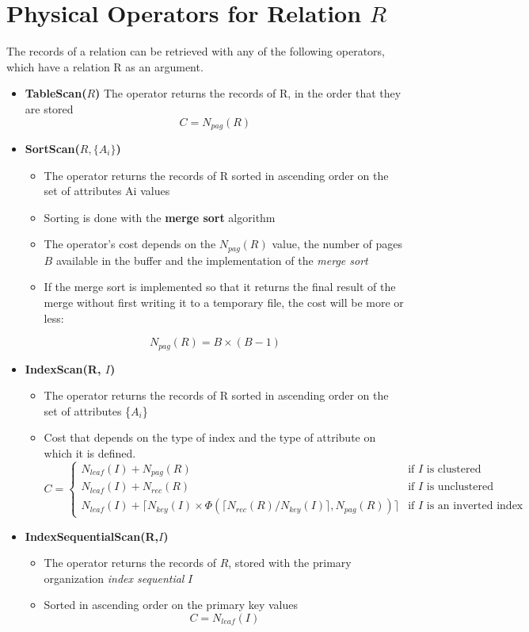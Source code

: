 \section{Physical Operators for Relation $R$}
The records of a relation can be retrieved with any of the following operators, which have a relation R as an argument.
\begin{itemize}
    \item \textbf{TableScan($R$)} The operator returns the records of R, in the order that they are stored
    $$C=N_{pag}(R)$$
    \item \textbf{SortScan($R,\{A_i\}$)} 
    \begin{itemize}
        \item The operator returns the records of R sorted in ascending order on the set of attributes {Ai} values
        \item Sorting is done with the \textbf{merge sort} algorithm
        \item The operator’s cost depends on the $N_{pag}(R)$ value, the number of pages $B$ available in the buffer and the implementation of the \textit{merge sort}
        \item If the merge sort is implemented so that it returns the final result of the merge without first writing it to a temporary file, the cost will be more or less:
    \end{itemize}
    $$N_{pag}(R) = B \times (B-1)$$
    \item \textbf{IndexScan(R, $I$)}
    \begin{itemize}
        \item The operator returns the records of R sorted in ascending order on the set of attributes \{$A_i$\}
        \item Cost that depends on the type of index and the type of attribute on which it is defined.
        \[
        C = 
        \begin{cases}
        N_{leaf}(I) + N_{pag}(R) & \mbox{if } I\mbox{ is clustered} \\
        N_{leaf}(I) + N_{rec}(R) & \mbox{if } I\mbox{ is unclustered} \\
        N_{leaf}(I) + \lceil N_{key}(I) \times \Phi (\lceil N_{rec}(R)/N_{key}(I)\rceil, N_{pag}(R))\rceil & \mbox{if } I\mbox{ is an inverted index} 
        \end{cases}
        \]
        \end{itemize}
    \item \textbf{IndexSequentialScan(R,$I$)}
    \begin{itemize}
        \item The operator returns the records of $R$, stored with the primary organization \textit{index sequential} $I$
        \item Sorted in ascending order on the primary key values
        $$C = N_{leaf}(I)$$
    \end{itemize}
\end{itemize}

